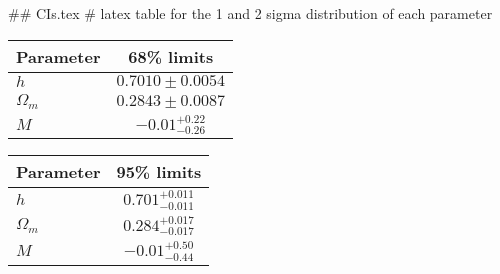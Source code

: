 ## CIs.tex
# latex table for the 1 and 2 sigma distribution of each parameter

\begin{tabular} { l  c}
 Parameter &  68\% limits\\
\hline
{\boldmath$h              $} & $0.7010\pm 0.0054          $\\
{\boldmath$\Omega_m       $} & $0.2843\pm 0.0087          $\\
{\boldmath$M              $} & $-0.01^{+0.22}_{-0.26}     $\\
\hline
\end{tabular}

\begin{tabular} { l  c}
 Parameter &  95\% limits\\
\hline
{\boldmath$h              $} & $0.701^{+0.011}_{-0.011}   $\\
{\boldmath$\Omega_m       $} & $0.284^{+0.017}_{-0.017}   $\\
{\boldmath$M              $} & $-0.01^{+0.50}_{-0.44}     $\\
\hline
\end{tabular}
